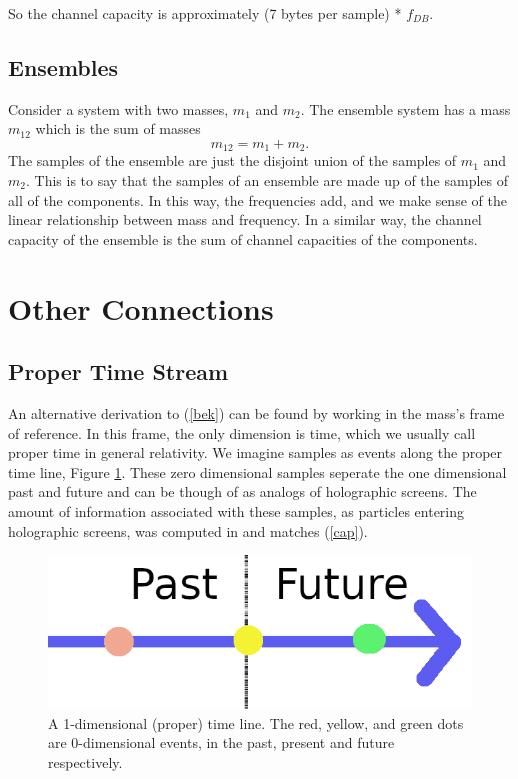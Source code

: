 \documentclass[12pt,a4paper]{article}
\begin{document}
So the channel capacity is approximately (7 bytes per sample) * $f_{DB}$.
\subsection{Ensembles}
Consider a system with two masses, $m_1$ and $m_2$.  The ensemble system has a mass $m_{12}$ which is the sum of masses
\[
m_{12} = m_1 + m_2.
\]
The samples of the ensemble are just the disjoint union of the samples of $m_1$ and $m_2$.   This is to say that the samples of an ensemble are made up of the samples of all of the components.  In this way, the frequencies add, and we make sense of the linear relationship between mass and frequency.  In a similar way, the channel capacity of the ensemble is the sum of channel capacities of the components.

\section{Other Connections}
\label{time}
\subsection{Proper Time Stream}
An alternative derivation to (\ref{bek}) can be found by working in the mass's frame of reference. In this frame, the only dimension is time, which we usually call proper time in general relativity.  We imagine samples as events along the proper time line, Figure \ref{timeline}.  These zero dimensional samples seperate the one dimensional past and future and can be though of as analogs of holographic screens.  The amount of information associated with these samples, as particles entering holographic screens, was computed in \cite{thrust} and matches (\ref{cap}).

\begin{figure}[h]
\centering
\includegraphics[scale=0.23]{time_line.png}
\caption{A 1-dimensional (proper) time line.  The red, yellow, and green dots are 0-dimensional events, in the past, present and future respectively.}
\label{timeline}
\end{figure}
\end{document}
